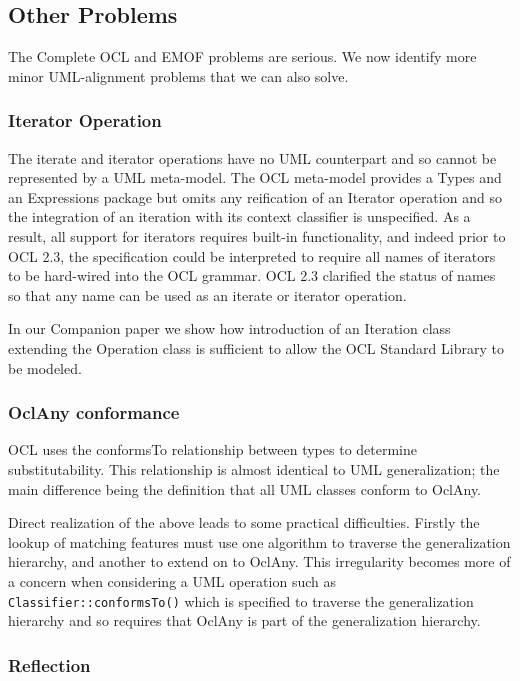 \documentclass{eceasst}
\begin{document}
\subsection{Other Problems}

The Complete OCL and EMOF problems are serious. We now identify more minor UML-alignment problems that we can also solve. 

\subsubsection{Iterator Operation}

The iterate and iterator operations have no UML counterpart and so cannot be represented by a UML meta-model. The OCL meta-model provides a Types and an Expressions package but omits any reification of an Iterator operation and so the integration of an iteration with its context classifier is unspecified. As a result, all support for iterators requires built-in functionality, and indeed prior to OCL 2.3, the specification could be interpreted to require all names of iterators to be hard-wired into the OCL grammar. OCL 2.3 clarified the status of names so that any name can be used as an iterate or iterator operation.

In our Companion paper\cite{OCL-stdlib} we show how introduction of an Iteration class extending the Operation class is sufficient to allow the OCL Standard Library to be modeled.

\subsubsection{OclAny conformance}

OCL uses the conformsTo relationship between types to determine substitutability. This relationship is almost identical to UML generalization; the main difference being the definition that all UML classes conform to OclAny.

Direct realization of the above leads to some practical difficulties. Firstly the lookup of matching features must use one algorithm to traverse the generalization hierarchy, and another to extend on to OclAny. This irregularity becomes more of a concern when considering a UML operation such as \verb|Classifier::conformsTo()| which is specified to traverse the generalization hierarchy and so requires that OclAny is part of the generalization hierarchy.

\subsubsection{Reflection}
\end{document}
